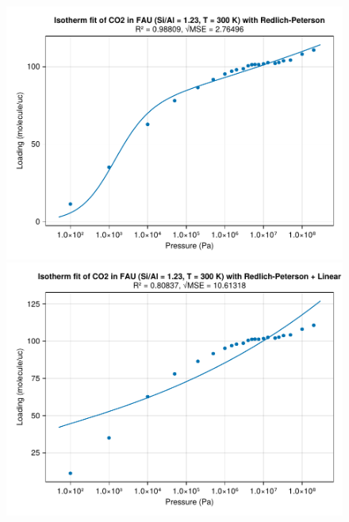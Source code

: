 \documentclass[main.tex]{subfiles}
\begin{document}
\begin{figure}
	\begin{minipage}{0.49\columnwidth}
		\includegraphics[width=\columnwidth]{figures/isotherms/Redlich-Peterson.pdf}
	\end{minipage}\hfill%
	\begin{minipage}{0.49\columnwidth}
		\includegraphics[width=\columnwidth]{figures/isotherms/Redlich-Peterson + Linear.pdf}
	\end{minipage}


\end{figure}
\end{document}

